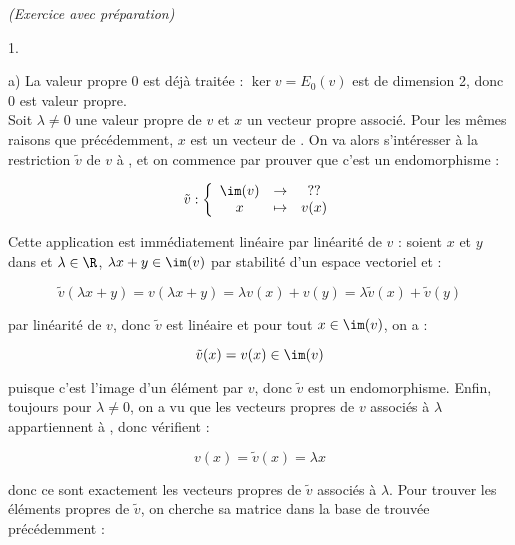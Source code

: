 \documentclass[11pt]{article}%
\begin{document}
\begin{exercice}{\it (Exercice avec préparation)}
\begin{noliste}{1.}
\begin{noliste}{a)}
 La valeur propre 0 est déjà traitée : $\ker v = E_{0} (v)$ est de
dimension 2, donc 0 est valeur propre. \\

 Soit $\lambda \neq 0$ une valeur propre de $v$ et $x$ un vecteur
propre associé. Pour les mêmes raisons que précédemment, $x$ est un
vecteur de . On va alors s'intéresser à la restriction
$\tilde{v}$ de $v$ à , et on commence par prouver que c'est un
endomorphisme : 
 
\[
 \tilde{v} : \left\{ 
\begin{array}{ccc}
 \im(v) & \rightarrow & ? ? \\
x & \mapsto & v ( x ) \\
\end{array}
\right. 
\]

 Cette application est immédiatement linéaire par linéarité de $v$ :
soient $x$ et $y$ dans  et $\lambda \in \R$, $ \lambda x + y \in
\im(v)$ par stabilité d'un espace vectoriel et :
 
\[
 \tilde{v} ( \lambda x + y ) = v ( \lambda x + y ) = \lambda v(x) +
v(y) = \lambda \tilde{v} (x) + \tilde{v} (y) 
\]

 par linéarité de $v$, donc $\tilde{v}$ est linéaire et pour tout $x
\in \im(v)$, on a : 
 
\[
\tilde{v} (x) = v ( x ) \in \im(v)
\]

 puisque c'est l'image d'un élément par $v$, donc $\tilde{v}$ est un
endomorphisme. Enfin, toujours pour $\lambda \neq 0$, on a vu que les
vecteurs propres de $v$ associés à $\lambda$ appartiennent à ,
donc vérifient : 
 
\[
 v(x) = \tilde{v} ( x ) = \lambda x 
\]

 donc ce sont exactement les vecteurs propres de $\tilde{v}$ associés à
$\lambda$. Pour trouver les éléments propres de $\tilde{v}$, on cherche
sa matrice dans la base de  trouvée précédemment : 
 

\end{noliste}
\end{noliste}
\end{exercice}
\end{document}
